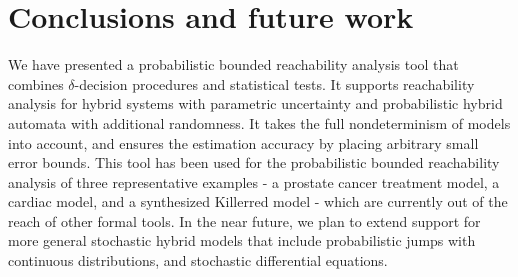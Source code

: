 \section{Conclusions and future work}
We have presented a probabilistic bounded reachability analysis tool that combines $\delta$-decision 
procedures and statistical tests. It supports reachability analysis for hybrid systems with parametric 
uncertainty and probabilistic hybrid automata with additional randomness. It takes the full nondeterminism of models into account, and ensures the estimation accuracy by placing arbitrary small error bounds. This tool has been used for the probabilistic bounded reachability analysis of three representative examples - a prostate 
cancer treatment model, a cardiac model, and a synthesized Killerred model - which are currently out of the reach of other formal tools. In the near future, we plan to extend support for more general stochastic hybrid models 
that include probabilistic jumps with continuous distributions, and stochastic differential equations.
